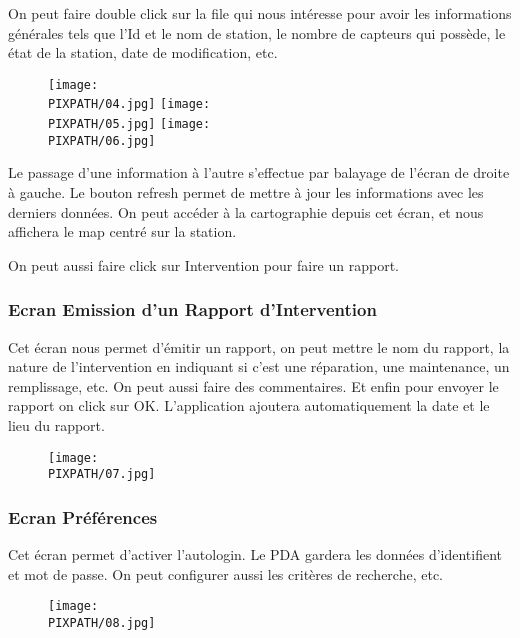 On peut faire double click sur la file qui nous intéresse pour avoir les informations générales tels que l'Id et le nom de station, le nombre de capteurs qui possède, le état de la station, date de modification, etc.

\begin{figure}[!htbp]
\begin{center}
\texttt{[image: \\PIXPATH/04.jpg]}              
\texttt{[image: \\PIXPATH/05.jpg]}              
\texttt{[image: \\PIXPATH/06.jpg]}              
\end{center}
\end{figure} 
Le passage d'une information à l'autre s'effectue par balayage de l'écran de droite à gauche. 
Le bouton refresh permet de mettre à jour les informations avec les derniers données.
On peut accéder à la cartographie depuis cet écran, et nous affichera le map centré sur la station.

On peut aussi faire click sur Intervention pour faire un rapport.

\vfil
\pagebreak
\subsubsection{Ecran Emission d'un Rapport d'Intervention}
Cet écran nous permet d'émitir un rapport, on peut mettre le nom du rapport, la nature de l'intervention en indiquant si c'est une réparation, une maintenance, un remplissage, etc. 
On peut aussi faire des commentaires. Et enfin pour envoyer le rapport on click sur OK. L'application ajoutera automatiquement la date et le lieu du rapport.

\begin{figure}[!h] 
\begin{center}
\texttt{[image: \\PIXPATH/07.jpg]}
\end{center}
\end{figure}

\vfil
\pagebreak
\subsubsection{Ecran Préférences}
Cet écran permet d'activer l'autologin. Le PDA gardera les données d'identifient et mot de passe.
On peut configurer aussi les critères de recherche, etc.
\begin{figure}[!h] 
\begin{center}
\texttt{[image: \\PIXPATH/08.jpg]}
\end{center}
\end{figure}



